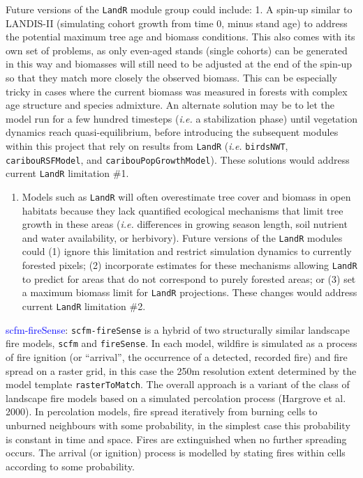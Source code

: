 \documentclass[]{article}
\providecommand{\tightlist}{%
  \setlength{\itemsep}{0pt}\setlength{\parskip}{0pt}}
\begin{document}
Future versions of the \texttt{LandR} module group could include: 1. A
spin-up similar to LANDIS-II (simulating cohort growth from time 0,
minus stand age) to address the potential maximum tree age and biomass
conditions. This also comes with its own set of problems, as only
even-aged stands (single cohorts) can be generated in this way and
biomasses will still need to be adjusted at the end of the spin-up so
that they match more closely the observed biomass. This can be
especially tricky in cases where the current biomass was measured in
forests with complex age structure and species admixture. An alternate
solution may be to let the model run for a few hundred timesteps
(\emph{i.e.} a stabilization phase) until vegetation dynamics reach
quasi-equilibrium, before introducing the subsequent modules within this
project that rely on results from \texttt{LandR} (\emph{i.e.}
\texttt{birdsNWT}, \texttt{caribouRSFModel}, and
\texttt{caribouPopGrowthModel}). These solutions would address current
\texttt{LandR} limitation \#1.

\begin{enumerate}
\def\labelenumi{\arabic{enumi}.}
\setcounter{enumi}{1}
\tightlist
\item
  Models such as \texttt{LandR} will often overestimate tree cover and
  biomass in open habitats because they lack quantified ecological
  mechanisms that limit tree growth in these areas (\emph{i.e.}
  differences in growing season length, soil nutrient and water
  availability, or herbivory). Future versions of the \texttt{LandR}
  modules could (1) ignore this limitation and restrict simulation
  dynamics to currently forested pixels; (2) incorporate estimates for
  these mechanisms allowing \texttt{LandR} to predict for areas that do
  not correspond to purely forested areas; or (3) set a maximum biomass
  limit for \texttt{LandR} projections. These changes would address
  current \texttt{LandR} limitation \#2.
\end{enumerate}

\textcolor{blue}{scfm-fireSense}: \texttt{scfm-fireSense} is a hybrid of
two structurally similar landscape fire models, \texttt{scfm} and
\texttt{fireSense}. In each model, wildfire is simulated as a process of
fire ignition (or ``arrival'', the occurrence of a detected, recorded
fire) and fire spread on a raster grid, in this case the 250m resolution
extent determined by the model template \texttt{rasterToMatch}. The
overall approach is a variant of the class of landscape fire models
based on a simulated percolation process (Hargrove et al. 2000). In
percolation models, fire spread iteratively from burning cells to
unburned neighbours with some probability, in the simplest case this
probability is constant in time and space. Fires are extinguished when
no further spreading occurs. The arrival (or ignition) process is
modelled by stating fires within cells according to some probability.
\end{document}
